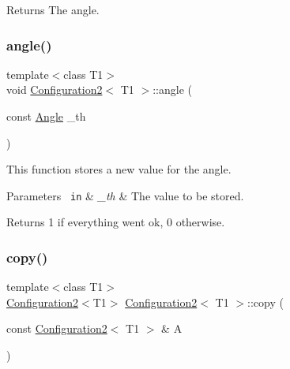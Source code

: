 \begin{DoxyReturn}{Returns}
The angle. 
\end{DoxyReturn}
\mbox{\label{class_configuration2_a8ff42470c34aaa1885df5974e8b7896d}} 
\subsubsection{\texorpdfstring{angle()}{angle()}\hspace{0.1cm}{\footnotesize\ttfamily [2/2]}}
{\footnotesize\ttfamily template$<$class T1$>$ \\
void \mbox{\hyperlink{class_configuration2}{Configuration2}}$<$ T1 $>$\+::angle (\begin{DoxyParamCaption}\item[{const \mbox{\hyperlink{class_angle}{Angle}}}]{\+\_\+th }\end{DoxyParamCaption})\hspace{0.3cm}{\ttfamily [inline]}}



This function stores a new value for the angle. 


\begin{DoxyParams}[1]{Parameters}
\mbox{\texttt{ in}}  & {\em \+\_\+th} & The value to be stored. \\
\hline
\end{DoxyParams}
\begin{DoxyReturn}{Returns}
1 if everything went ok, 0 otherwise. 
\end{DoxyReturn}
\mbox{\label{class_configuration2_a8b0bb9f80a69ff8d70af39adf97ceb46}} 
\subsubsection{\texorpdfstring{copy()}{copy()}}
{\footnotesize\ttfamily template$<$class T1$>$ \\
\mbox{\hyperlink{class_configuration2}{Configuration2}}$<$T1$>$ \mbox{\hyperlink{class_configuration2}{Configuration2}}$<$ T1 $>$\+::copy (\begin{DoxyParamCaption}\item[{const \mbox{\hyperlink{class_configuration2}{Configuration2}}$<$ T1 $>$ \&}]{A }\end{DoxyParamCaption})\hspace{0.3cm}{\ttfamily [inline]}}



